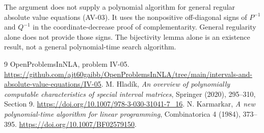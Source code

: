 \documentclass[11pt,a4paper]{article}
\theoremstyle{remark}\newtheorem{remark}[theorem]{Remark}
\newcommand{\repo}[1]{\url{https://github.com/ajt60gaibb/OpenProblemsInNLA/tree/main/intervals-and-absolute-value-equations/#1}}
\begin{document}
The argument does not supply a polynomial algorithm for general regular absolute value equations (AV-03). It uses the nonpositive off-diagonal signs of $P^{-1}$ and $Q^{-1}$ in the coordinate-decrease proof of complementarity. General regularity alone does not provide those signs. The bijectivity lemma alone is an existence result, not a general polynomial-time search algorithm.
\begin{thebibliography}{9}
 OpenProblemsInNLA, problem IV-05. \repo{IV-05}.
 M. Hlad\'ik, \emph{An overview of polynomially computable characteristics of special interval matrices}, Springer (2020), 295--310, Section 9. \url{https://doi.org/10.1007/978-3-030-31041-7_16}.
 N. Karmarkar, \emph{A new polynomial-time algorithm for linear programming}, Combinatorica 4 (1984), 373--395. \url{https://doi.org/10.1007/BF02579150}.
\end{thebibliography}
\end{document}
